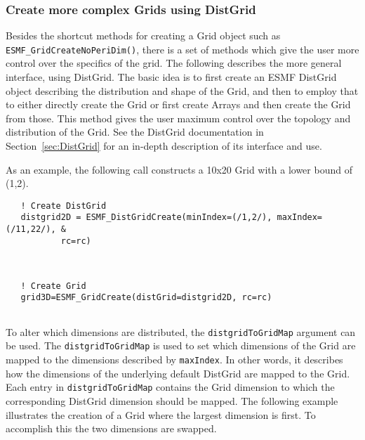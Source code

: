 
  \subsubsection{Create more complex Grids using DistGrid}
  \label{sec:usage:adv:create}
  
   Besides the shortcut methods for creating a Grid object such as
   {\tt ESMF\_GridCreateNoPeriDim()}, there is
   a set of methods which give the user more control over the
   specifics of the grid.  The following describes the more
   general interface, using DistGrid.
   The basic idea is to first create an ESMF DistGrid object describing
   the distribution and shape of the Grid, and then to employ that to either directly
   create the Grid or first create Arrays and then create the Grid from those.
   This method gives the user maximum control over the topology and distribution of the Grid.
   See the DistGrid documentation in Section~\ref{sec:DistGrid} for an
   in-depth description of its interface and use.
  
   As an example, the following call constructs
   a 10x20 Grid with a lower bound of (1,2). 

 \begin{verbatim}
   ! Create DistGrid
   distgrid2D = ESMF_DistGridCreate(minIndex=(/1,2/), maxIndex=(/11,22/), &
           rc=rc)
 
\end{verbatim}
 

 \begin{verbatim}

   ! Create Grid
   grid3D=ESMF_GridCreate(distGrid=distgrid2D, rc=rc)
 
\end{verbatim}
 

   \begin{sloppypar}
   To alter which dimensions are distributed, the {\tt distgridToGridMap}
   argument can be used. The {\tt distgridToGridMap} is used to set
   which dimensions of the Grid are mapped to the dimensions
   described by {\tt maxIndex}. In other words, it describes how the dimensions of
   the underlying default DistGrid are mapped to the Grid. Each entry
   in {\tt distgridToGridMap} contains the Grid dimension to which the corresponding
   DistGrid dimension should be mapped.
   The following example illustrates the creation of a Grid where the largest
   dimension is first. To accomplish this the two dimensions are swapped.
   \end{sloppypar} 

